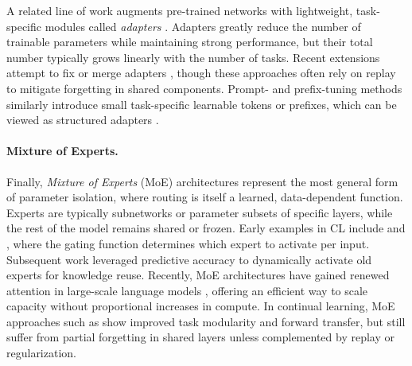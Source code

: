 \documentclass[10pt]{article} %
\begin{document}
A related line of work augments pre-trained networks with lightweight, task-specific modules called \emph{adapters} \citep{rebuffiLearningMultipleVisual2017,houlsbyParameterEfficientTransferLearning2019}. 
Adapters greatly reduce the number of trainable parameters while maintaining strong performance, but their total number typically grows linearly with the number of tasks. 
Recent extensions attempt to fix or merge adapters \citep{ermisMemoryEfficientContinual2023,zhangContinualSequenceGeneration2022,pfeifferAdapterFusionNonDestructiveTask2021}, though these approaches often rely on replay to mitigate forgetting in shared components. 
Prompt- and prefix-tuning methods \citep{wangLearningPromptContinual2022,wangDualPromptComplementaryPrompting2022,smithCODAPromptCOntinualDecomposed2023} similarly introduce small task-specific learnable tokens or prefixes, which can be viewed as structured adapters \citep{heUnifiedViewParameterEfficient2022}.

\paragraph{Mixture of Experts.}
Finally, \emph{Mixture of Experts} (MoE) architectures represent the most general form of parameter isolation, where routing is itself a learned, data-dependent function. 
Experts are typically subnetworks or parameter subsets of specific layers, while the rest of the model remains shared or frozen. 
Early examples in CL include \citet{aljundiExpertGateLifelong2017} and \citet{collierRoutingNetworksCotraining2020}, where the gating function determines which expert to activate per input. 
Subsequent work \citep{rameshModelZooGrowing2022} leveraged predictive accuracy to dynamically activate old experts for knowledge reuse. 
Recently, MoE architectures have gained renewed attention in large-scale language models \citep{fedusSwitchTransformersScaling2022,duGLaMEfficientScaling2022,zhangLessBetterEfficient2025}, offering an efficient way to scale capacity without proportional increases in compute. 
In continual learning, MoE approaches such as \citet{gururanganDEMixLayersDisentangling2021,chenLifelongLanguagePretraining2023} show improved task modularity and forward transfer, but still suffer from partial forgetting in shared layers unless complemented by replay or regularization.
\end{document}
